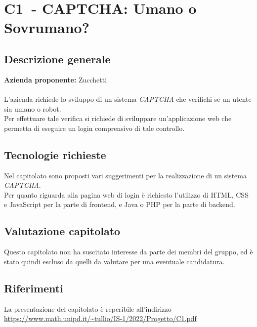 
\renewcommand{\capName}{CAPTCHA: Umano o Sovrumano?} %
\renewcommand{\capCode}{C1} %
\renewcommand{\capLink}{https://www.math.unipd.it/~tullio/IS-1/2022/Progetto/C1.pdf} %
\renewcommand{\capProposer}{Zucchetti} %


\section{\capCode\ - \capName}
\subsection{Descrizione generale}
\textbf{Azienda proponente:} Zucchetti\\
\\
L'azienda richiede lo sviluppo di un sistema \emph{CAPTCHA} che verifichi se un utente sia umano o robot. \\
Per effettuare tale verifica si richiede di sviluppare un'applicazione web che permetta di eseguire un login comprensivo di tale controllo.

\subsection{Tecnologie richieste}
Nel capitolato sono proposti vari suggerimenti per la realizzazione di un sistema \emph{CAPTCHA}. \\
Per quanto riguarda alla pagina web di login è richiesto l'utilizzo di HTML, CSS e JavaScript per la parte di frontend, e Java o PHP per la parte di backend.

\subsection{Valutazione capitolato}
Questo capitolato non ha suscitato interesse da parte dei membri del gruppo, ed è stato quindi escluso da quelli da valutare per una eventuale candidatura.

\subsection{Riferimenti}
La presentazione del capitolato è reperibile all'indirizzo \url{\capLink}